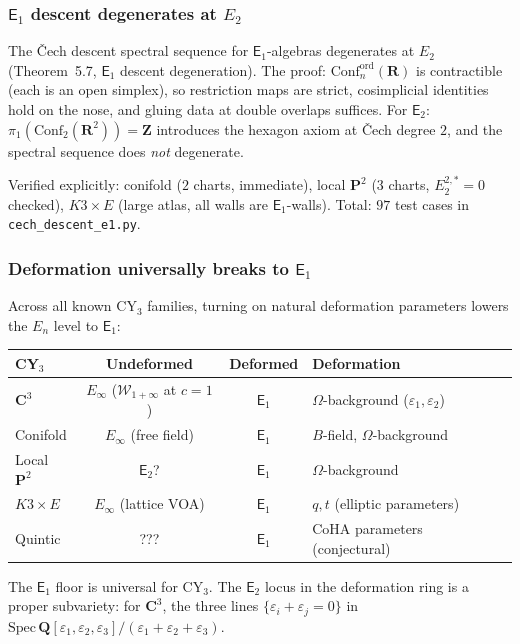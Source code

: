 \documentclass[11pt]{article}
\newcommand{\Eone}{\mathsf{E}_1}
\newcommand{\Etwo}{\mathsf{E}_2}
\begin{document}
\subsubsection{$\Eone$ descent degenerates at $E_2$}

The \v{C}ech descent spectral sequence for $\Eone$-algebras degenerates at $E_2$ (Theorem~5.7, $\Eone$ descent degeneration). The proof: $\mathrm{Conf}_n^{\mathrm{ord}}(\mathbf{R})$ is contractible (each is an open simplex), so restriction maps are strict, cosimplicial identities hold on the nose, and gluing data at double overlaps suffices. For $\Etwo$: $\pi_1(\mathrm{Conf}_2(\mathbf{R}^2)) = \mathbf{Z}$ introduces the hexagon axiom at \v{C}ech degree $2$, and the spectral sequence does \emph{not} degenerate.

Verified explicitly: conifold ($2$ charts, immediate), local $\mathbf{P}^2$ ($3$ charts, $E_2^{2,*} = 0$ checked), $K3 \times E$ (large atlas, all walls are $\Eone$-walls). Total: $97$ test cases in \texttt{cech\_descent\_e1.py}.

\subsubsection{Deformation universally breaks to $\Eone$}

Across all known CY$_3$ families, turning on natural deformation parameters lowers the $E_n$ level to $\Eone$:
\begin{center}
\renewcommand{\arraystretch}{1.2}
\small
\begin{tabular}{lccl}
 \toprule
 CY$_3$ & Undeformed & Deformed & Deformation \\
 \midrule
 $\mathbf{C}^3$ & $E_\infty$ ($\mathcal{W}_{1+\infty}$ at $c=1$) & $\Eone$ & $\Omega$-background ($\varepsilon_1, \varepsilon_2$) \\
 Conifold & $E_\infty$ (free field) & $\Eone$ & $B$-field, $\Omega$-background \\
 Local $\mathbf{P}^2$ & $\Etwo$? & $\Eone$ & $\Omega$-background \\
 $K3 \times E$ & $E_\infty$ (lattice VOA) & $\Eone$ & $q, t$ (elliptic parameters) \\
 Quintic & ??? & $\Eone$ & CoHA parameters (conjectural) \\
 \bottomrule
\end{tabular}
\end{center}

\noindent The $\Eone$ floor is universal for CY$_3$. The $\Etwo$ locus in the deformation ring is a proper subvariety: for $\mathbf{C}^3$, the three lines $\{\varepsilon_i + \varepsilon_j = 0\}$ in $\mathrm{Spec}\,\mathbf{Q}[\varepsilon_1, \varepsilon_2, \varepsilon_3]/(\varepsilon_1 + \varepsilon_2 + \varepsilon_3)$.
\end{document}
